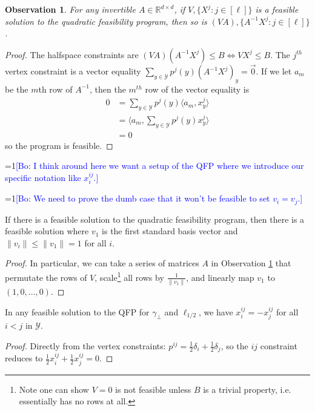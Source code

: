 \documentclass[anon]{colt2020} %
\newcommand{\Comments}{1}
\newcommand{\mynote}[2]{\ifnum\Comments=1\textcolor{#1}{#2}\fi}
\newcommand{\bo}[1]{\mynote{blue}{[Bo: #1]}}
\newcommand{\reals}{\mathbb{R}}
\newcommand{\Y}{\mathcal{Y}}
\newcommand{\inprod}[2]{\langle #1, #2 \rangle}%
\newtheorem{observation}{Observation}
\begin{document}
\begin{observation} \label{obs:qfp-invariant-lin}
  For any invertible $A \in \reals^{d \times d}$, if $V,\{X^j : j \in [\ell]\}$ is a feasible solution to the quadratic feasibility program, then so is $(VA),\{A^{-1}X^j : j \in [\ell]\}$.
\end{observation}
\begin{proof}
  The halfspace constraints are $(VA)(A^{-1}X^j) \leq B \iff VX^{j} \leq B$.
  The $j^{th}$ vertex constraint is a vector equality $\sum_{y \in \Y} p^j(y) (A^{-1}X^j)_y = \vec{0}$.
  If we let $a_m$ be the $m$th row of $A^{-1}$, then the $m^{th}$ row of the vector equality is
  \begin{align*}
    0 &= \sum_{y \in \Y} p^j(y) \inprod{a_m}{x^j_y}  \\
      &= \inprod{a_m}{\sum_{y \in \Y} p^j(y) x^j_y}  \\
      &= 0
  \end{align*}
  so the program is feasible.
\end{proof}

\bo{I think around here we want a setup of the QFP where we introduce our specific notation like $x^{ij}_i$.}

\bo{We need to prove the dumb case that it won't be feasible to set $v_i = v_j$.}

\begin{corollary} \label{cor:qfp-wlog-v1}
  If there is a feasible solution to the quadratic feasibility program, then there is a feasible solution where $v_1$ is the first standard basis vector and $\|v_i\| \leq \|v_1\| = 1$ for all $i$.
\end{corollary}
\begin{proof}
  In particular, we can take a series of matrices $A$ in Observation \ref{obs:qfp-invariant-lin} that permutate the rows of $V$, scale\footnote{Note one can show $V = 0$ is not feasible unless $B$ is a trivial property, i.e. essentially has no rows at all.} all rows by $\frac{1}{\|v_1\|}$, and linearly map $v_1$ to $(1,0,\dots,0)$.
\end{proof}

\begin{lemma} \label{lemma:xiji-minus-xijj}
  In any feasible solution to the QFP for $\gamma_{\bot}$ and $\ell_{1/2}$, we have $x^{ij}_i = -x^{ij}_j$ for all $i<j$ in $\Y$.
\end{lemma}
\begin{proof}
  Directly from the vertex constraints: $p^{ij} = \frac{1}{2}\delta_i + \frac{1}{2}\delta_j$, so the $ij$ constraint reduces to $\frac{1}{2}x^{ij}_i + \frac{1}{2}x^{ij}_j = 0$.
\end{proof}
\end{document}
